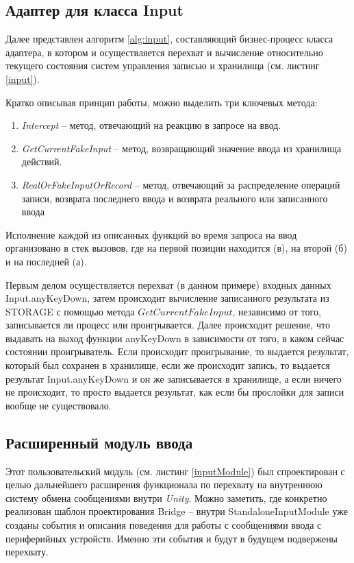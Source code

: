 \subsection{Адаптер для класса Input}
Далее представлен алгоритм \ref{alg:input}, составляющий бизнес-процесс класса адаптера, в котором и осуществляется перехват и вычисление относительно текущего состояния систем управления записью и хранилища (см. листинг \ref{input}).

\newpage
Кратко описывая принцип работы, можно выделить три ключевых метода: 
\begin{enumerate}
	\item \textit{Intercept} -- метод, отвечающий на реакцию в запросе на ввод.
	\item \textit{GetCurrentFakeInput} -- метод, возвращающий значение ввода из хранилища действий.
	\item \textit{RealOrFakeInputOrRecord} -- метод, отвечающий за распределение операций записи, возврата последнего ввода и возврата реального или записанного ввода
\end{enumerate}

Исполнение каждой из описанных функций во время запроса на ввод организовано в стек вызовов, где на первой позиции находится (в), на второй (б) и на последней (а).

Первым делом осуществляется перехват (в данном примере) входных данных Input.anyKeyDown, затем происходит вычисление записанного результата из STORAGE с помощью метода $GetCurrentFakeInput$, независимо от того, записывается ли процесс или проигрывается. Далее происходит решение, что выдавать на выход функции anyKeyDown в зависимости от того, в каком сейчас состоянии проигрыватель. Если происходит проигрывание, то выдается результат, который был сохранен в хранилище, если же происходит запись, то выдается результат Input.anyKeyDown и он же записывается в хранилище, а если ничего не происходит, то просто выдается результат, как если бы прослойки для записи вообще не существовало.

\subsection{Расширенный модуль ввода}
Этот пользовательский модуль (см. листинг \ref{inputModule}) был спроектирован с целью дальнейшего расширения функционала по перехвату на внутреннюю систему обмена сообщениями внутри \textit{Unity}. Можно заметить, где конкретно реализован шаблон проектирования Bridge -- внутри StandaloneInputModule уже созданы события и описания поведения для работы с сообщениями ввода с периферийных устройств. Именно эти события и будут в будущем подвержены перехвату.

